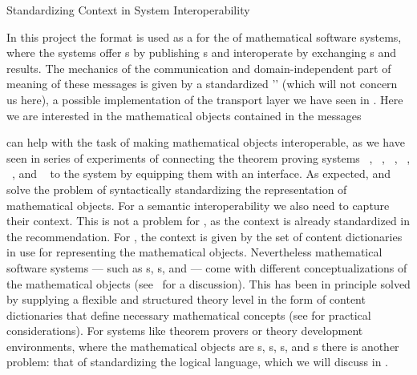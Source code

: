 
\begin{omgroup}[id=logics,creators=miko]{Standardizing Context in System Interoperability}

  In this project the {\omdoc} format is used as a {} for the
  {} of mathematical software systems, where the
  systems offer {s} by publishing
  {s} and interoperate by exchanging
  {s} and results. The mechanics of the communication and
  domain-independent part of meaning of these messages is given by a standardized
  '{}' (which will not concern us here), a possible implementation
  of the transport layer we have seen in {}. Here we are interested in
  the mathematical objects contained in the messages

{\omdoc} can help with the task of making mathematical objects interoperable, as we have
seen in series of experiments of connecting the theorem proving systems
{\OMEGA}~\cite{BenzmuellerEtAl:otama97}, {\inka}~\cite{HuSe:itng96}, {\pvs}~\cite{OwRu92},
{\lambdaclam}~\cite{RicSmaGre:ppihol98}, {\tps}~\cite{AnBi:tatps96}, and
{\coq}~\cite{CoqManual} to the {\mbase} system by equipping them with an {\omdoc}
interface. As expected, {\openmath} and {\cmathml} solve the problem of syntactically
standardizing the representation of mathematical objects. For a semantic interoperability
we also need to capture their context. This is not a problem for {\cmathml}, as the
context is already standardized in the {\mathml} recommendation. For {\openmath}, the
context is given by the set of content dictionaries in use for representing the
mathematical objects. Nevertheless mathematical software systems --- such as
{s}, {s}, and
{} --- come with different conceptualizations of the
mathematical objects (see~\cite{KohKoh:esmk05} for a discussion). This has been in
principle solved by supplying a flexible and structured theory level in the form of
{\omdoc} content dictionaries that define necessary mathematical concepts (see
{} for practical considerations). For systems like
theorem provers or theory development environments, where the mathematical objects are
{s}, {s}, {s}, and
{s} there is another problem: that of standardizing the logical language,
which we will discuss in {}.


\end{omgroup}
